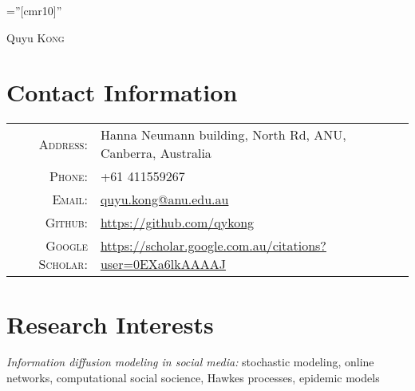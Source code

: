\documentclass[a4paper,10pt]{article}
\begin{document}
\pagestyle{empty} %

\font\fb=''[cmr10]'' %

\par{\centering
		{\Huge Quyu \textsc{Kong}
	}\bigskip\par}

\section{Contact Information}

\begin{tabular}{rl}
    \textsc{Address:}   & Hanna Neumann building, North Rd, ANU, Canberra, Australia \\
    \textsc{Phone:}     & +61 411559267\\
    \textsc{Email:}     & \href{mailto:quyu.kong@anu.edu.au}{quyu.kong@anu.edu.au} \\
    \textsc{Github:} &
    \href{https://github.com/qykong}{https://github.com/qykong} \\
    \textsc{Google Scholar:} &
    \href{https://scholar.google.com.au/citations?user=0EXa6lkAAAAJ&hl=en}{https://scholar.google.com.au/citations?user=0EXa6lkAAAAJ} \\
\end{tabular}

\section{Research Interests}
\textit{Information diffusion modeling in social media:} stochastic modeling, online networks, computational social socience, Hawkes processes, epidemic models
\end{document}
